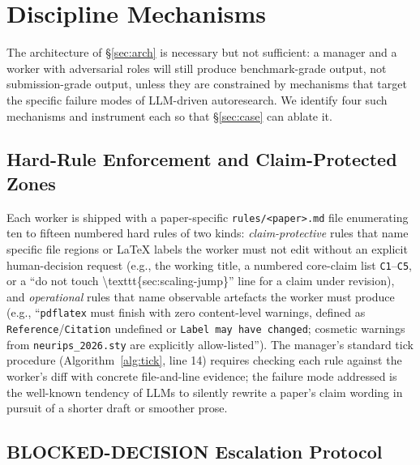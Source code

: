\section{Discipline Mechanisms}
\label{sec:discipline}

The architecture of \S\ref{sec:arch} is necessary but not sufficient: a
manager and a worker with adversarial roles will still produce
benchmark-grade output, not submission-grade output, unless they are
constrained by mechanisms that target the specific failure modes of
LLM-driven autoresearch. We identify four such mechanisms and instrument
each so that \S\ref{sec:case} can ablate it.

\subsection{Hard-Rule Enforcement and Claim-Protected Zones}
\label{sec:discipline-rules}

Each worker is shipped with a paper-specific
\texttt{rules/<paper>.md} file enumerating ten to fifteen numbered hard
rules of two kinds: \emph{claim-protective} rules that name specific
file regions or LaTeX labels the worker must not edit without an
explicit human-decision request (e.g., the working title, a numbered
core-claim list \texttt{C1}--\texttt{C5}, or a ``do not touch
\textbackslash texttt\{sec:scaling-jump\}'' line for a claim under
revision), and \emph{operational} rules that name observable artefacts
the worker must produce (e.g., ``\texttt{pdflatex} must finish with zero
content-level warnings, defined as \texttt{Reference}/\texttt{Citation}
undefined or \texttt{Label may have changed}; cosmetic warnings from
\texttt{neurips\_2026.sty} are explicitly allow-listed''). The manager's
standard tick procedure (Algorithm~\ref{alg:tick}, line 14) requires
checking each rule against the worker's diff with concrete
file-and-line evidence; the failure mode addressed is the well-known
tendency of LLMs to silently rewrite a paper's claim wording in pursuit
of a shorter draft or smoother prose.

\subsection{BLOCKED-DECISION Escalation Protocol}
\label{sec:discipline-blocked}

